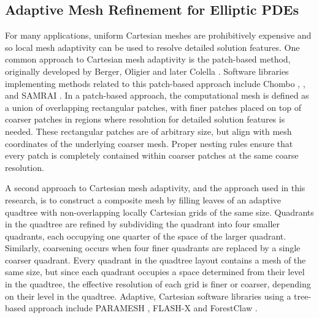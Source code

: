 
\subsection{Adaptive Mesh Refinement for Elliptic PDEs}

For many applications, uniform Cartesian meshes are prohibitively expensive and so local mesh adaptivity can be used to resolve detailed solution features.  One common approach to Cartesian mesh adaptivity is the patch-based method, originally developed by Berger, Oligier and later Colella . Software libraries implementing methods related to this patch-based approach include Chombo \citep{colella2009chombo}, \amrex \citep{zhang2019amrex}, and SAMRAI \citep{hornung2006managing}. In a patch-based approach, the computational mesh is defined as a union of overlapping rectangular patches, with finer patches placed on top of coarser patches in regions where resolution for  detailed solution features is needed.  These rectangular patches are of arbitrary size, but align with mesh coordinates of the underlying coarser mesh. Proper nesting rules ensure that every patch is completely contained within coarser patches at the same coarse resolution.

A second approach to Cartesian mesh adaptivity, and the approach used in this research, is to construct a composite mesh by filling leaves of an adaptive quadtree with non-overlapping locally Cartesian grids of the same size. Quadrants in the quadtree are refined by subdividing the quadrant into four smaller quadrants, each occupying one quarter of the space of the larger quadrant. Similarly, coarsening occurs when four finer quadrants are replaced by a single coarser quadrant.  Every quadrant in the quadtree layout contains a mesh of the same size, but since each quadrant occupies a space determined from their level in the quadtree, the effective resolution of each grid is finer or coarser, depending on their level in the quadtree.  Adaptive, Cartesian software libraries using a tree-based approach include PARAMESH \citep{globisch1995parmesh}, FLASH-X \citep{dubey2022flash} and ForestClaw \citep{calhoun2017forestclaw}.


